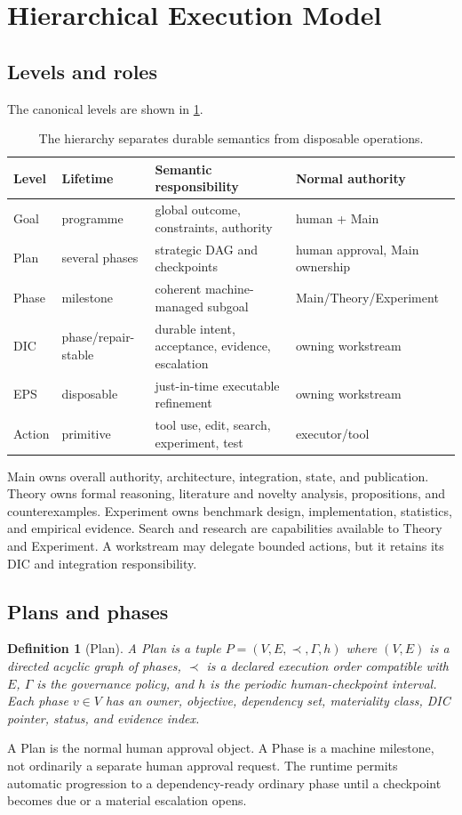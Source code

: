 \documentclass[11pt]{article}
\newtheorem{definition}{Definition}[section]
\begin{document}
\section{Hierarchical Execution Model}
\subsection{Levels and roles}
The canonical levels are shown in \ref{tab:levels}.
\begin{table}[ht]
\centering
\small
\begin{tabularx}{\textwidth}{@{}l l X X@{}}
\toprule
Level & Lifetime & Semantic responsibility & Normal authority\\
\midrule
Goal & programme & global outcome, constraints, authority & human + Main\\
Plan & several phases & strategic DAG and checkpoints & human approval, Main ownership\\
Phase & milestone & coherent machine-managed subgoal & Main/Theory/Experiment\\
DIC & phase/repair-stable & durable intent, acceptance, evidence, escalation & owning workstream\\
EPS & disposable & just-in-time executable refinement & owning workstream\\
Action & primitive & tool use, edit, search, experiment, test & executor/tool\\
\bottomrule
\end{tabularx}
\caption{The hierarchy separates durable semantics from disposable operations.}
\label{tab:levels}
\end{table}

Main owns overall authority, architecture, integration, state, and publication. Theory owns formal reasoning, literature and novelty analysis, propositions, and counterexamples. Experiment owns benchmark design, implementation, statistics, and empirical evidence. Search and research are capabilities available to Theory and Experiment. A workstream may delegate bounded actions, but it retains its DIC and integration responsibility.

\subsection{Plans and phases}
\begin{definition}[Plan]
A Plan is a tuple $P=(V,E,\prec,\Gamma,h)$ where $(V,E)$ is a directed acyclic graph of phases, $\prec$ is a declared execution order compatible with $E$, $\Gamma$ is the governance policy, and $h$ is the periodic human-checkpoint interval. Each phase $v\in V$ has an owner, objective, dependency set, materiality class, DIC pointer, status, and evidence index.
\end{definition}
A Plan is the normal human approval object. A Phase is a machine milestone, not ordinarily a separate human approval request. The runtime permits automatic progression to a dependency-ready ordinary phase until a checkpoint becomes due or a material escalation opens.
\end{document}
